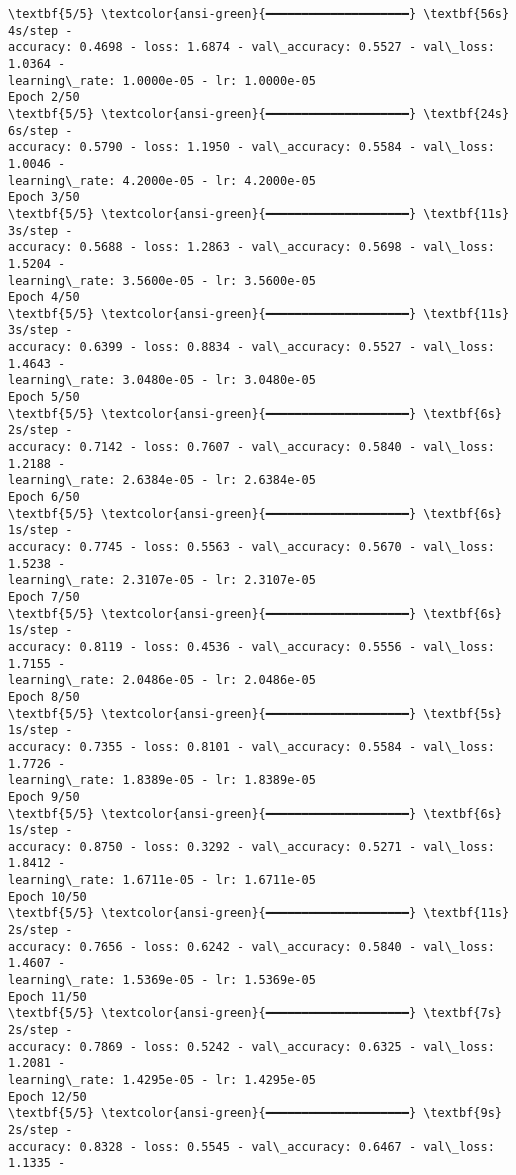 \documentclass[11pt]{article}
\begin{document}
    \begin{Verbatim}[commandchars=\\\{\}]
\textbf{5/5} \textcolor{ansi-green}{━━━━━━━━━━━━━━━━━━━━} \textbf{56s} 4s/step -
accuracy: 0.4698 - loss: 1.6874 - val\_accuracy: 0.5527 - val\_loss: 1.0364 -
learning\_rate: 1.0000e-05 - lr: 1.0000e-05
Epoch 2/50
\textbf{5/5} \textcolor{ansi-green}{━━━━━━━━━━━━━━━━━━━━} \textbf{24s} 6s/step -
accuracy: 0.5790 - loss: 1.1950 - val\_accuracy: 0.5584 - val\_loss: 1.0046 -
learning\_rate: 4.2000e-05 - lr: 4.2000e-05
Epoch 3/50
\textbf{5/5} \textcolor{ansi-green}{━━━━━━━━━━━━━━━━━━━━} \textbf{11s} 3s/step -
accuracy: 0.5688 - loss: 1.2863 - val\_accuracy: 0.5698 - val\_loss: 1.5204 -
learning\_rate: 3.5600e-05 - lr: 3.5600e-05
Epoch 4/50
\textbf{5/5} \textcolor{ansi-green}{━━━━━━━━━━━━━━━━━━━━} \textbf{11s} 3s/step -
accuracy: 0.6399 - loss: 0.8834 - val\_accuracy: 0.5527 - val\_loss: 1.4643 -
learning\_rate: 3.0480e-05 - lr: 3.0480e-05
Epoch 5/50
\textbf{5/5} \textcolor{ansi-green}{━━━━━━━━━━━━━━━━━━━━} \textbf{6s} 2s/step -
accuracy: 0.7142 - loss: 0.7607 - val\_accuracy: 0.5840 - val\_loss: 1.2188 -
learning\_rate: 2.6384e-05 - lr: 2.6384e-05
Epoch 6/50
\textbf{5/5} \textcolor{ansi-green}{━━━━━━━━━━━━━━━━━━━━} \textbf{6s} 1s/step -
accuracy: 0.7745 - loss: 0.5563 - val\_accuracy: 0.5670 - val\_loss: 1.5238 -
learning\_rate: 2.3107e-05 - lr: 2.3107e-05
Epoch 7/50
\textbf{5/5} \textcolor{ansi-green}{━━━━━━━━━━━━━━━━━━━━} \textbf{6s} 1s/step -
accuracy: 0.8119 - loss: 0.4536 - val\_accuracy: 0.5556 - val\_loss: 1.7155 -
learning\_rate: 2.0486e-05 - lr: 2.0486e-05
Epoch 8/50
\textbf{5/5} \textcolor{ansi-green}{━━━━━━━━━━━━━━━━━━━━} \textbf{5s} 1s/step -
accuracy: 0.7355 - loss: 0.8101 - val\_accuracy: 0.5584 - val\_loss: 1.7726 -
learning\_rate: 1.8389e-05 - lr: 1.8389e-05
Epoch 9/50
\textbf{5/5} \textcolor{ansi-green}{━━━━━━━━━━━━━━━━━━━━} \textbf{6s} 1s/step -
accuracy: 0.8750 - loss: 0.3292 - val\_accuracy: 0.5271 - val\_loss: 1.8412 -
learning\_rate: 1.6711e-05 - lr: 1.6711e-05
Epoch 10/50
\textbf{5/5} \textcolor{ansi-green}{━━━━━━━━━━━━━━━━━━━━} \textbf{11s} 2s/step -
accuracy: 0.7656 - loss: 0.6242 - val\_accuracy: 0.5840 - val\_loss: 1.4607 -
learning\_rate: 1.5369e-05 - lr: 1.5369e-05
Epoch 11/50
\textbf{5/5} \textcolor{ansi-green}{━━━━━━━━━━━━━━━━━━━━} \textbf{7s} 2s/step -
accuracy: 0.7869 - loss: 0.5242 - val\_accuracy: 0.6325 - val\_loss: 1.2081 -
learning\_rate: 1.4295e-05 - lr: 1.4295e-05
Epoch 12/50
\textbf{5/5} \textcolor{ansi-green}{━━━━━━━━━━━━━━━━━━━━} \textbf{9s} 2s/step -
accuracy: 0.8328 - loss: 0.5545 - val\_accuracy: 0.6467 - val\_loss: 1.1335 -

\end{Verbatim}
\end{document}
